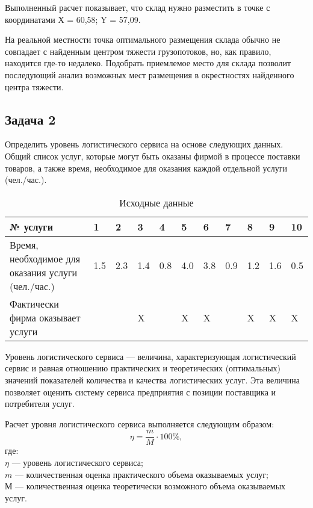 Выполненный расчет показывает, что склад нужно разместить в точке с координатами Х = 60,58; Y = 57,09.

На реальной местности точка оптимального размещения склада обычно не совпадает с найденным центром тяжести грузопотоков, но, как правило, находится где-то недалеко.
Подобрать приемлемое место для склада позволит последующий анализ возможных мест размещения в окрестностях найденного центра тяжести.

\subsection{Задача 2}
Определить уровень логистического сервиса на основе следующих данных.
Общий список услуг, которые могут быть оказаны фирмой в процессе поставки товаров, а также время, необходимое для оказания каждой отдельной услуги (чел./час.).

\begin{table}[]
	\small
	\centering
	\caption{Исходные данные}
	\label{my-label}
	\setlength{\extrarowheight}{1mm}
	\begin{tabularx}{\textwidth}{|p{4.2cm}|K{0.8cm}|K{0.8cm}|K{0.8cm}|K{0.8cm}|K{0.8cm}|K{0.8cm}|K{0.8cm}|K{0.8cm}|K{0.8cm}|K{0.8cm}|}
		\hline
		№ услуги                                           & 1   & 2   & 3   & 4   & 5   & 6   & 7   & 8   & 9   & 10  \\ \hline
		Время, необходимое для оказания услуги (чел./час.) & 1.5 & 2.3 & 1.4 & 0.8 & 4.0 & 3.8 & 0.9 & 1.2 & 1.6 & 0.5 \\ \hline
		Фактически фирма оказывает услуги&&&X&&X&X&&X&X&X \\ \hline
	\end{tabularx}
\end{table}

Уровень логистического сервиса --- величина, характеризующая логистический сервис и равная отношению практических и теоретических (оптимальных) значений показателей количества и качества логистических услуг.
Эта величина позволяет оценить систему сервиса предприятия с позиции поставщика и потребителя услуг.

Расчет уровня логистического сервиса выполняется следующим образом:
\[ \eta = \dfrac{m}{M} \cdot 100\%, \]
где:\\
$\eta$ --- уровень логистического сервиса;\\
$m$ --- количественная оценка практического объема оказываемых услуг;\\
$М$ --- количественная оценка теоретически возможного объема оказываемых услуг.

